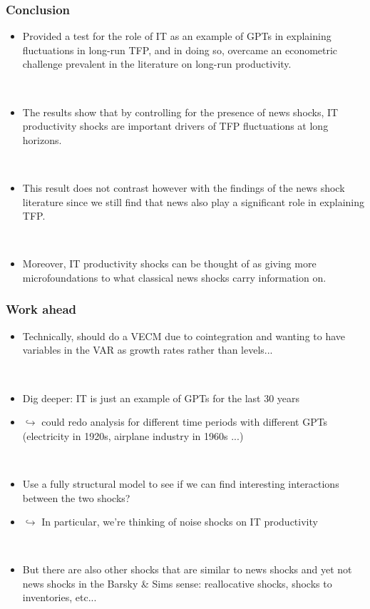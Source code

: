 \documentclass{beamer}
\begin{document}
\begin{frame}
	\frametitle{Conclusion} 
	
\begin{itemize}
\item Provided a test for the role of IT as an example of GPTs in explaining fluctuations in long-run TFP, and in doing so, overcame an econometric challenge prevalent in the literature on long-run productivity.

\ 

\item The results show that by controlling for the presence of news shocks, IT productivity shocks are important drivers of TFP fluctuations at long horizons.

\

\item This result does not contrast however with the findings of the news shock literature since we still find that news also play a significant role in explaining TFP. 

\

\item Moreover, IT productivity shocks can be thought of as giving more microfoundations to what classical news shocks carry information on. 

\end{itemize}
   		 	
\end{frame}

\begin{frame}
	\frametitle{Work ahead} 
	
\begin{itemize}

\item Technically, should do a VECM due to cointegration and wanting to have variables in the VAR as growth rates rather than levels...

\

\item Dig deeper: IT is just an example of GPTs for the last 30 years
\item[] $\hookrightarrow$ could redo analysis for different time periods with different GPTs (electricity in 1920s, airplane industry in 1960s ...)

\


\item Use a fully structural model to see if we can find interesting interactions between the two shocks?
\item [] $\hookrightarrow$ In particular, we're thinking of noise shocks on IT productivity

\	
	
\item But there are also other shocks that are similar to news shocks and yet not news shocks in the Barsky \& Sims sense: reallocative shocks, shocks to inventories, etc...  
\end{itemize}


   		 	
\end{frame}
\end{document}
